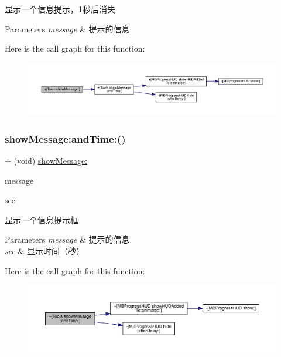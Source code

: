 显示一个信息提示，1秒后消失


\begin{DoxyParams}{Parameters}
{\em message} & 提示的信息 \\
\hline
\end{DoxyParams}
Here is the call graph for this function\+:\nopagebreak
\begin{figure}[H]
\begin{center}
\leavevmode
\includegraphics[width=350pt]{interface_tools_a70f7dfa59f08955e4d44de2245914ed1_cgraph}
\end{center}
\end{figure}
\mbox{\label{interface_tools_a86359d5e764207dc442d96e85579b637}} 
\subsubsection{\texorpdfstring{show\+Message\+:and\+Time\+:()}{showMessage:andTime:()}}
{\footnotesize\ttfamily + (void) \mbox{\hyperlink{interface_tools_a70f7dfa59f08955e4d44de2245914ed1}{show\+Message\+:}} \begin{DoxyParamCaption}\item[{(N\+S\+String $\ast$)}]{message }\item[{andTime:(float)}]{sec }\end{DoxyParamCaption}}

显示一个信息提示框


\begin{DoxyParams}{Parameters}
{\em message} & 提示的信息 \\
\hline
{\em sec} & 显示时间（秒） \\
\hline
\end{DoxyParams}
Here is the call graph for this function\+:\nopagebreak
\begin{figure}[H]
\begin{center}
\leavevmode
\includegraphics[width=350pt]{interface_tools_a86359d5e764207dc442d96e85579b637_cgraph}
\end{center}
\end{figure}
\mbox{\label{interface_tools_ab8cd6d19b8b8ca7d647306f6d5611d0d}} 
